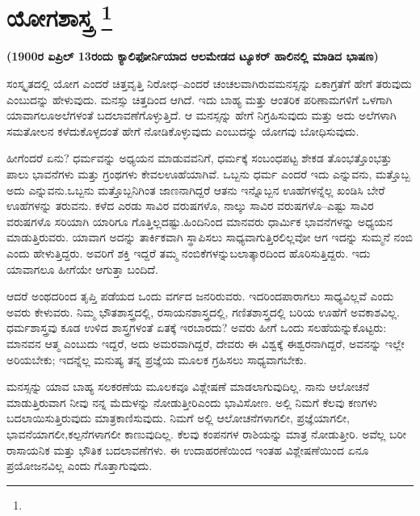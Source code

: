 
\vspace{-0.8cm}

\chapter[ಯೋಗಶಾಸ್ತ್ರ ]{ಯೋಗಶಾಸ್ತ್ರ \protect\footnote{}}

\begin{center}
\textbf{(1900ರ ಏಪ್ರಿಲ್​ 13ರಂದು ಕ್ಯಾಲಿಫೋರ್ನಿಯಾದ ಆಲಮೇಡದ ಟ್ಯೂಕರ್​ ಹಾಲಿನಲ್ಲಿ ಮಾಡಿದ ಭಾಷಣ)}
\end{center}

ಸಂಸ್ಕೃತದಲ್ಲಿ ಯೋಗ ಎಂದರೆ ಚಿತ್ತವೃತ್ತಿ ನಿರೋಧ–ಎಂದರೆ ಚಂಚಲವಾಗಿರುವ\break ಮನಸ್ಸನ್ನು ಏಕಾಗ್ರತೆಗೆ ಹೇಗೆ ತರುವುದು ಎಂಬುದನ್ನು ಹೇಳುವುದು. ಮನಸ್ಸು ಚಿತ್ತದಿಂದ ಆಗಿದೆ. ಇದು ಬಾಹ್ಯ ಮತ್ತು ಆಂತರಿಕ ಪರಿಣಾಮಗಳಿಗೆ ಒಳಗಾಗಿ ಯಾವಾಗಲೂ\break ಅಲೆಗಳಂತೆ ಬದಲಾವಣೆಗೊಳ್ಳುತ್ತಿದೆ. ಆ ಮನಸ್ಸನ್ನು ಹೇಗೆ ನಿಗ್ರಹಿಸುವುದು ಮತ್ತು ಅದು ಅಲೆಗಳಾಗಿ ಸಮತೋಲನ ಕಳೆದುಕೊಳ್ಳದಂತೆ ಹೇಗೆ ನೋಡಿಕೊಳ್ಳುವುದು ಎಂಬುದನ್ನು ಯೋಗವು ಬೋಧಿಸುವುದು.

ಹೀಗೆಂದರೆ ಏನು? ಧರ್ಮವನ್ನು ಅಧ್ಯಯನ ಮಾಡುವವನಿಗೆ, ಧರ್ಮಕ್ಕೆ ಸಂಬಂಧಪಟ್ಟ ಶೇಕಡ ತೊಂಭತ್ತೊಂಭತ್ತು ಪಾಲು ಭಾವನೆಗಳು ಮತ್ತು ಗ್ರಂಥಗಳು ಕೇವಲ\break ಊಹೆಯಾಗಿವೆ. ಒಬ್ಬನು ಧರ್ಮ ಎಂದರೆ ಇದು ಎನ್ನುವನು, ಮತ್ತೊಬ್ಬ ಅದು ಎನ್ನುವನು.\break ಒಬ್ಬನು ಮತ್ತೊಬ್ಬನಿಗಿಂತ ಜಾಣನಾಗಿದ್ದರೆ ಆತನು ಇನ್ನೊಬ್ಬನ ಊಹೆಗಳನ್ನೆಲ್ಲ ಖಂಡಿಸಿ ಬೇರೆ ಊಹೆಗಳನ್ನು ತರುವನು. ಕಳೆದ ಎರಡು ಸಾವಿರ ವರುಷಗಳೊ, ನಾಲ್ಕು ಸಾವಿರ ವರುಷಗಳೊ–ಎಷ್ಟು ಸಾವಿರ ವರುಷಗಳೊ ಸರಿಯಾಗಿ ಯಾರಿಗೂ ಗೊತ್ತಿಲ್ಲದಷ್ಟು.\break ಹಿಂದಿನಿಂದ ಮಾನವರು ಧಾರ್ಮಿಕ ಭಾವನೆಗಳನ್ನು ಅಧ್ಯಯನ ಮಾಡುತ್ತಿರುವರು. ಯಾವಾಗ ಅದನ್ನು ತಾರ್ಕಿಕವಾಗಿ ಸ್ಥಾಪಿಸಲು ಸಾಧ್ಯವಾಗುತ್ತಿರಲಿಲ್ಲವೋ ಆಗ ಇದನ್ನು ಸುಮ್ಮನೆ ನಂಬಿ ಎಂದು ಹೇಳುತ್ತಿದ್ದರು. ಅವರಿಗೆ ಶಕ್ತಿ ಇದ್ದರೆ ತಮ್ಮ ನಂಬಿಕೆಗಳನ್ನು\break ಬಲಾತ್ಕಾರದಿಂದ ಹೊರಿಸುತ್ತಿದ್ದರು. ಇದು ಯಾವಾಗಲೂ ಹೀಗೆಯೇ ಆಗುತ್ತಾ ಬಂದಿದೆ.

\vskip 5pt

ಆದರೆ ಅಂಥದರಿಂದ ತೃಪ್ತಿ ಪಡೆಯದ ಒಂದು ವರ್ಗದ ಜನರಿರುವರು. ಇದರಿಂದ\break ಪಾರಾಗಲು ಸಾಧ್ಯವಿಲ್ಲವೆ ಎಂದು ಅವರು ಕೇಳುವರು. ನಿಮ್ಮ ಭೌತಶಾಸ್ತ್ರದಲ್ಲಿ, ರಸಾಯನ\break ಶಾಸ್ತ್ರದಲ್ಲಿ, ಗಣಿತಶಾಸ್ತ್ರದಲ್ಲಿ ಬರಿಯ ಊಹೆಗೆ ಅವಕಾಶವಿಲ್ಲ. ಧರ್ಮಶಾಸ್ತ್ರವು ಕೂಡ ಉಳಿದ ಶಾಸ್ತ್ರಗಳಂತೆ ಏತಕ್ಕೆ ಇರಬಾರದು? ಅವರು ಹೀಗೆ ಒಂದು ಸಲಹೆಯನ್ನು\break ಕೊಟ್ಟರು: ಮಾನವನ ಆತ್ಮ ಎಂಬುದು ಇದ್ದರೆ, ಅದು ಅಮರವಾಗಿದ್ದರೆ, ದೇವರು ಈ ವಿಶ್ವಕ್ಕೆ ಈಶ್ವರನಾಗಿದ್ದರೆ, ಅವನನ್ನು ಇಲ್ಲೇ ಅರಿಯಬೇಕು; ಇದನ್ನೆಲ್ಲ ಮನುಷ್ಯ ತನ್ನ ಪ್ರಜ್ಞೆಯ ಮೂಲಕ ಗ್ರಹಿಸಲು ಸಾಧ್ಯವಾಗಬೇಕು.

\vskip 3pt

ಮನಸ್ಸನ್ನು ಯಾವ ಬಾಹ್ಯ ಸಲಕರಣೆಯ ಮೂಲಕವೂ ವಿಶ್ಲೇಷಣೆ ಮಾಡಲಾಗುವುದಿಲ್ಲ. ನಾನು ಆಲೋಚನೆ ಮಾಡುತ್ತಿರುವಾಗ ನೀವು ನನ್ನ ಮೆದುಳನ್ನು ನೋಡುತ್ತೀರಿ\break ಎಂದು ಭಾವಿಸೋಣ. ಅಲ್ಲಿ ನಿಮಗೆ ಕೆಲವು ಕಣಗಳು ಬದಲಾಯಿಸುತ್ತಿರುವುದು ಮಾತ್ರ\break ಕಾಣಿಸುವುದು. ನಿಮಗೆ ಅಲ್ಲಿ ಆಲೋಚನೆಗಳಾಗಲೀ, ಪ್ರಜ್ಞೆಯಾಗಲೀ, ಭಾವನೆಯಾಗಲೀ,\break ಕಲ್ಪನೆಗಳಾಗಲೀ ಕಾಣುವುದಿಲ್ಲ. ಕೆಲವು ಕಂಪನಗಳ ರಾಶಿಯನ್ನು ಮಾತ್ರ ನೋಡುತ್ತೀರಿ. ಅವೆಲ್ಲ ಬರೀ ರಾಸಾಯನಿಕ ಮತ್ತು ಭೌತಿಕ ಬದಲಾವಣೆಗಳು. ಈ ಉದಾಹರಣೆಯಿಂದ ಇಂತಹ ವಿಶ್ಲೇಷಣೆಯಿಂದ ಏನೂ ಪ್ರಯೋಜನವಿಲ್ಲ ಎಂದು ಗೊತ್ತಾಗುವುದು.

